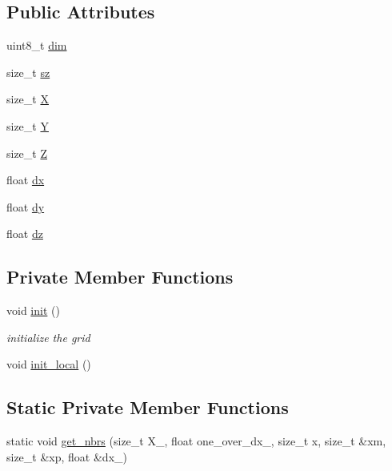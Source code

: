 \subsection*{Public Attributes}
\begin{DoxyCompactItemize}
\item 
uint8\+\_\+t \hyperlink{struct_r_grid_a7b2de275d56e211269b9b648a3f4d913}{dim}
\item 
size\+\_\+t \hyperlink{struct_r_grid_ab50f43bfbd55e4ad265ca7d90395b0fa}{sz}
\item 
size\+\_\+t \hyperlink{struct_r_grid_a0d0c563000e5e25df807dd22e838043c}{X}
\item 
size\+\_\+t \hyperlink{struct_r_grid_aa24f14994d1fbd47f8dabf85c6364143}{Y}
\item 
size\+\_\+t \hyperlink{struct_r_grid_aa5276511c713a4fb0c4145af7ac321d0}{Z}
\item 
float \hyperlink{struct_r_grid_a3e28ca78f21ea577c9d5fceac47c3f0f}{dx}
\item 
float \hyperlink{struct_r_grid_a031239faf877acea3fcd18e687bfd9f3}{dy}
\item 
float \hyperlink{struct_r_grid_ab329ff4fc41070804a9aa9d5a7792ba4}{dz}
\end{DoxyCompactItemize}
\subsection*{Private Member Functions}
\begin{DoxyCompactItemize}
\item 
void \hyperlink{struct_r_grid_a00eb36a95486d6ef44140d5cd55e9613}{init} ()
\begin{DoxyCompactList}\small\item\em initialize the grid \end{DoxyCompactList}\item 
void \hyperlink{struct_r_grid_ac826111379bf58202fe1db2efec84f6d}{init\+\_\+local} ()
\end{DoxyCompactItemize}
\subsection*{Static Private Member Functions}
\begin{DoxyCompactItemize}
\item 
static void \hyperlink{struct_r_grid_a7f46d3d8d93a39f55cba18aa7d910b15}{get\+\_\+nbrs} (size\+\_\+t X\+\_\+, float one\+\_\+over\+\_\+dx\+\_\+, size\+\_\+t x, size\+\_\+t \&xm, size\+\_\+t \&xp, float \&dx\+\_\+)
\end{DoxyCompactItemize}
